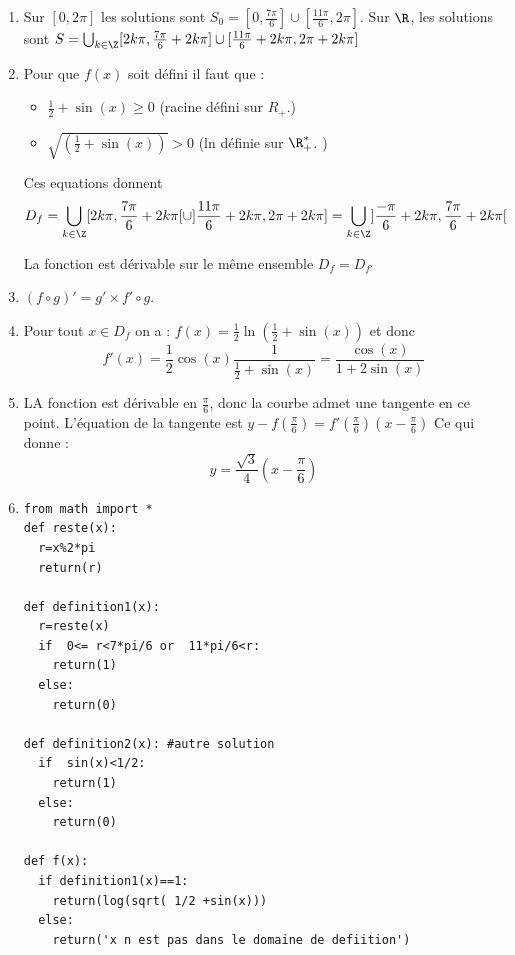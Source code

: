 \begin{correction}
\begin{enumerate}
\item Sur $[0,2\pi]$ les solutions sont $S_0=[0,\frac{7\pi}{6}]\cup [\frac{11\pi}{6},2\pi]$. Sur $\R$, les solutions sont $S=\bigcup_{k\in \Z} [2k\pi,\frac{7\pi}{6}+2k\pi]\cup [\frac{11\pi}{6}+2k\pi,2\pi+2k\pi]$
\item Pour que $f(x)$ soit défini il faut que : 

\begin{itemize}
\item  $\frac{1}{2}+\sin(x) \geq 0$ (racine défini sur $R_+$.)
\item  $\sqrt{(\frac{1}{2}+\sin(x) )} >0$  (ln définie sur $\R_+^*$. )
\end{itemize}
Ces equations donnent $$D_f = \bigcup_{k\in \Z} [2k\pi,\frac{7\pi}{6}+2k\pi[\cup ]\frac{11\pi}{6}+2k\pi,2\pi+2k\pi]=\bigcup_{k\in \Z} ]\frac{-\pi}{6}+2k\pi,\frac{7\pi}{6}+2k\pi[ $$

La fonction est dérivable sur le même ensemble $D_f=D_{f'}$

\item $(f\circ g)' = g' \times f'\circ g$. 
\item Pour tout $x\in D_{f}$ on a :
$f(x) = \frac{1}{2}\ln(\frac{1}{2}+\sin(x))$ et donc
$$f'(x) = \frac{1}{2} \cos(x) \frac{1}{\frac{1}{2}+\sin(x)}= \frac{\cos(x)}{1+2\sin(x)}$$
\item LA fonction est dérivable en $\frac{\pi}{6}$, donc la courbe admet une tangente en ce point.  L'équation de la tangente est $y-f(\frac{\pi}{6}) =f'(\frac{\pi}{6}) (x-\frac{\pi}{6}) $ Ce qui donne : 
$$ y =\frac{\sqrt{3}}{4}(x-\frac{\pi}{6})$$ 


\item
\begin{lstlisting}
from math import *
def reste(x):
  r=x%2*pi
  return(r)
  
def definition1(x):
  r=reste(x)
  if  0<= r<7*pi/6 or  11*pi/6<r:
    return(1)
  else:
    return(0)

def definition2(x): #autre solution
  if  sin(x)<1/2:
    return(1)
  else:
    return(0)
    
def f(x):
  if definition1(x)==1:
    return(log(sqrt( 1/2 +sin(x)))
  else:
    return('x n est pas dans le domaine de defiition')
   
\end{lstlisting}
\end{enumerate}
\end{correction}







